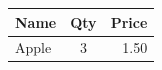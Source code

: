 \begin{tabular}{|l|c|r|}
  \hline
  Name & Qty & Price \\
  \hline
  Apple & 3 & 1.50 \\
  \hline
\end{tabular}
